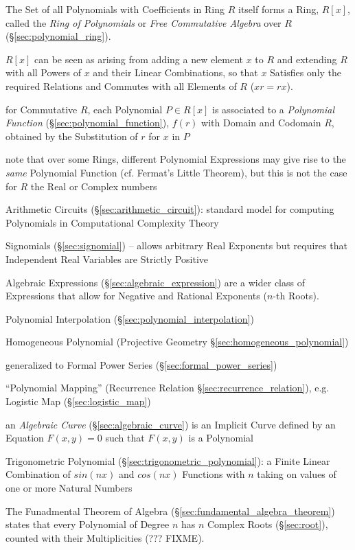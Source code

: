 The Set of all Polynomials with Coefficients in Ring $R$ itself forms a Ring,
$R[x]$, called the \emph{Ring of Polynomials} or \emph{Free Commutative Algebra}
over $R$ (\S\ref{sec:polynomial_ring}).

$R[x]$ can be seen as arising from adding a new element $x$ to $R$ and
extending $R$ with all Powers of $x$ and their Linear Combinations, so that $x$
Satisfies only the required Relations and Commutes with all Elements of $R$ ($xr
= rx$).

for Commutative $R$, each Polynomial $P \in R[x]$ is associated to a
\emph{Polynomial Function} (\S\ref{sec:polynomial_function}), $f(r)$ with Domain
and Codomain $R$, obtained by the Substitution of $r$ for $x$ in $P$

note that over some Rings, different Polynomial Expressions may give rise to the
\emph{same} Polynomial Function (cf. Fermat's Little Theorem), but this is not
the case for $R$ the Real or Complex numbers

\fist Arithmetic Circuits (\S\ref{sec:arithmetic_circuit}): standard model for
computing Polynomials in Computational Complexity Theory

\fist Signomials (\S\ref{sec:signomial}) -- allows arbitrary Real Exponents but
requires that Independent Real Variables are Strictly Positive

\fist Algebraic Expressions (\S\ref{sec:algebraic_expression}) are a wider
class of Expressions that allow for Negative and Rational Exponents ($n$-th
Roots).

\fist Polynomial Interpolation (\S\ref{sec:polynomial_interpolation})

\fist Homogeneous Polynomial (Projective Geometry
\S\ref{sec:homogeneous_polynomial})

\fist generalized to Formal Power Series (\S\ref{sec:formal_power_series})

\fist ``Polynomial Mapping'' (Recurrence Relation
\S\ref{sec:recurrence_relation}), e.g. Logistic Map (\S\ref{sec:logistic_map})

\fist an \emph{Algebraic Curve} (\S\ref{sec:algebraic_curve}) is an Implicit
Curve defined by an Equation $F(x,y) = 0$ such that $F(x,y)$ is a Polynomial

\fist Trigonometric Polynomial (\S\ref{sec:trigonometric_polynomial}): a Finite
Linear Combination of $sin(nx)$ and $cos(nx)$ Functions with $n$ taking on
values of one or more Natural Numbers

The Funadmental Theorem of Algebra (\S\ref{sec:fundamental_algebra_theorem})
states that every Polynomial of Degree $n$ has $n$ Complex Roots
(\S\ref{sec:root}), counted with their Multiplicities (??? FIXME).

